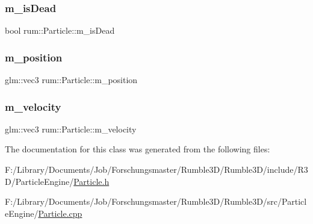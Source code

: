 \subsubsection{\texorpdfstring{m\+\_\+is\+Dead}{m\_isDead}}
{\footnotesize\ttfamily bool rum\+::\+Particle\+::m\+\_\+is\+Dead\hspace{0.3cm}{\ttfamily [protected]}}

\mbox{\label{classrum_1_1_particle_a6e7c397b620c9d03fb6c7d4359649d40}} 
\subsubsection{\texorpdfstring{m\+\_\+position}{m\_position}}
{\footnotesize\ttfamily glm\+::vec3 rum\+::\+Particle\+::m\+\_\+position\hspace{0.3cm}{\ttfamily [protected]}}

\mbox{\label{classrum_1_1_particle_a8dfab481a4ef728d40e86f7369baf307}} 
\subsubsection{\texorpdfstring{m\+\_\+velocity}{m\_velocity}}
{\footnotesize\ttfamily glm\+::vec3 rum\+::\+Particle\+::m\+\_\+velocity\hspace{0.3cm}{\ttfamily [protected]}}



The documentation for this class was generated from the following files\+:\begin{DoxyCompactItemize}
\item 
F\+:/\+Library/\+Documents/\+Job/\+Forschungsmaster/\+Rumble3\+D/\+Rumble3\+D/include/\+R3\+D/\+Particle\+Engine/\hyperlink{_particle_8h}{Particle.\+h}\item 
F\+:/\+Library/\+Documents/\+Job/\+Forschungsmaster/\+Rumble3\+D/\+Rumble3\+D/src/\+Particle\+Engine/\hyperlink{_particle_8cpp}{Particle.\+cpp}\end{DoxyCompactItemize}
